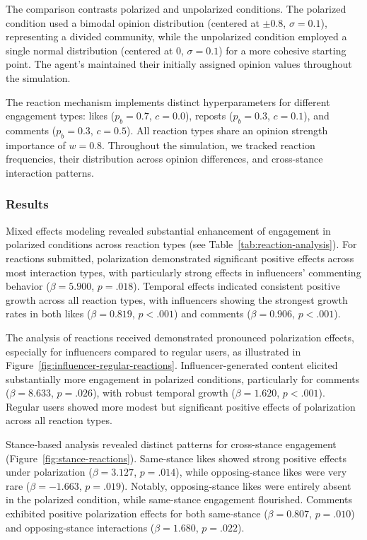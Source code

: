 The comparison contrasts polarized and unpolarized conditions. The polarized condition used a bimodal opinion distribution (centered at $\pm0.8$, $\sigma = 0.1$), representing a divided community, while the unpolarized condition employed a single normal distribution (centered at $0$, $\sigma = 0.1$) for a more cohesive starting point. The agent's maintained their initially assigned opinion values throughout the simulation.

The reaction mechanism implements distinct hyperparameters for different engagement types: likes ($p_b = 0.7$, $c = 0.0$), reposts ($p_b = 0.3$, $c = 0.1$), and comments ($p_b = 0.3$, $c = 0.5$). All reaction types share an opinion strength importance of $w = 0.8$. Throughout the simulation, we tracked reaction frequencies, their distribution across opinion differences, and cross-stance interaction patterns.

\subsubsection{Results}



Mixed effects modeling revealed substantial enhancement of engagement in polarized conditions across reaction types (see Table~\ref{tab:reaction-analysis}). For reactions submitted, polarization demonstrated significant positive effects across most interaction types, with particularly strong effects in influencers' commenting behavior ($\beta = 5.900$, $p = .018$). Temporal effects indicated consistent positive growth across all reaction types, with influencers showing the strongest growth rates in both likes ($\beta = 0.819$, $p < .001$) and comments ($\beta = 0.906$, $p < .001$).

The analysis of reactions received demonstrated pronounced polarization effects, especially for influencers compared to regular users, as illustrated in Figure~\ref{fig:influencer-regular-reactions}. Influencer-generated content elicited substantially more engagement in polarized conditions, particularly for comments ($\beta = 8.633$, $p = .026$), with robust temporal growth ($\beta = 1.620$, $p < .001$). Regular users showed more modest but significant positive effects of polarization across all reaction types.

Stance-based analysis revealed distinct patterns for cross-stance engagement (Figure~\ref{fig:stance-reactions}). Same-stance likes showed strong positive effects under polarization ($\beta = 3.127$, $p = .014$), while opposing-stance likes were very rare ($\beta = -1.663$, $p = .019$). Notably, opposing-stance likes were entirely absent in the polarized condition, while same-stance engagement flourished. Comments exhibited positive polarization effects for both same-stance ($\beta = 0.807$, $p = .010$) and opposing-stance interactions ($\beta = 1.680$, $p = .022$). 

